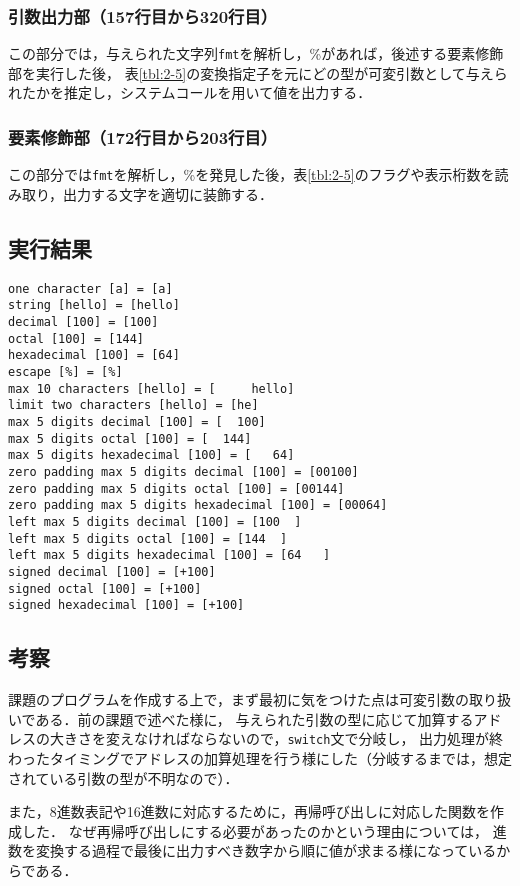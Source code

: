 \documentclass[a4j,11pt]{jarticle}
\begin{document}
\subsubsection{引数出力部（157行目から320行目）}

この部分では，与えられた文字列{{\tt fmt}}を解析し，\%があれば，後述する要素修飾部を実行した後，
表\ref{tbl:2-5}の変換指定子を元にどの型が可変引数として与えられたかを推定し，システムコールを用いて値を出力する．

\subsubsection{要素修飾部（172行目から203行目）}

この部分では{{\tt fmt}}を解析し，\%を発見した後，表\ref{tbl:2-5}のフラグや表示桁数を読み取り，出力する文字を適切に装飾する．

\subsection{実行結果}
\begin{verbatim}
one character [a] = [a]
string [hello] = [hello]
decimal [100] = [100]
octal [100] = [144]
hexadecimal [100] = [64]
escape [%] = [%]
max 10 characters [hello] = [     hello]
limit two characters [hello] = [he]
max 5 digits decimal [100] = [  100]
max 5 digits octal [100] = [  144]
max 5 digits hexadecimal [100] = [   64]
zero padding max 5 digits decimal [100] = [00100]
zero padding max 5 digits octal [100] = [00144]
zero padding max 5 digits hexadecimal [100] = [00064]
left max 5 digits decimal [100] = [100  ]
left max 5 digits octal [100] = [144  ]
left max 5 digits hexadecimal [100] = [64   ]
signed decimal [100] = [+100]
signed octal [100] = [+100]
signed hexadecimal [100] = [+100]
\end{verbatim}

\subsection{考察}
課題のプログラムを作成する上で，まず最初に気をつけた点は可変引数の取り扱いである．前の課題で述べた様に，
与えられた引数の型に応じて加算するアドレスの大きさを変えなければならないので，{{\tt switch}}文で分岐し，
出力処理が終わったタイミングでアドレスの加算処理を行う様にした（分岐するまでは，想定されている引数の型が不明なので）．

また，8進数表記や16進数に対応するために，再帰呼び出しに対応した関数を作成した．
なぜ再帰呼び出しにする必要があったのかという理由については，
進数を変換する過程で最後に出力すべき数字から順に値が求まる様になっているからである．
\end{document}
